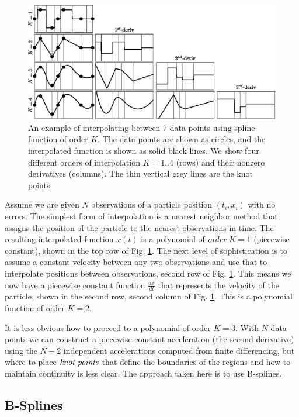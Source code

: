 \documentclass{ametsoc}
\begin{document}
\begin{figure}[h]
  \centerline{\includegraphics[width=39pc,angle=0]{interpolation.eps}}
  \caption{An example of interpolating between 7 data points using spline function of order $K$. The data points are shown as circles, and the interpolated function is shown as solid black lines. We show four different orders of interpolation $K=1..4$ (rows) and their nonzero derivatives (columns). The thin vertical grey lines are the knot points.}
  \label{interpolation}
\end{figure}

Assume we are given $N$ observations of a particle position $(t_i,x_i)$ with no errors. The simplest form of interpolation is a nearest neighbor method that assigns the position of the particle to the nearest observations in time. The resulting interpolated function $x(t)$ is a polynomial of \emph{order} $K=1$ (piecewise constant), shown in the top row of Fig. \ref{interpolation}. The next level of sophistication is to assume a constant velocity between any two observations and use that to interpolate positions between observations, second row of Fig. \ref{interpolation}. This means we now have a piecewise constant function $\frac{dx}{dt}$ that represents the velocity of the particle, shown in the second row, second column of Fig.  \ref{interpolation}. This is a polynomial function of order $K=2$.

It is less obvious how to proceed to a polynomial of order $K=3$. With $N$ data points we can construct a piecewise constant acceleration (the second derivative) using the $N-2$ independent accelerations computed from finite differencing, but where to place $\emph{knot points}$ that define the boundaries of the regions and how to maintain continuity is less clear. The approach taken here is to use B-splines.

\subsection{B-Splines}
\end{document}
